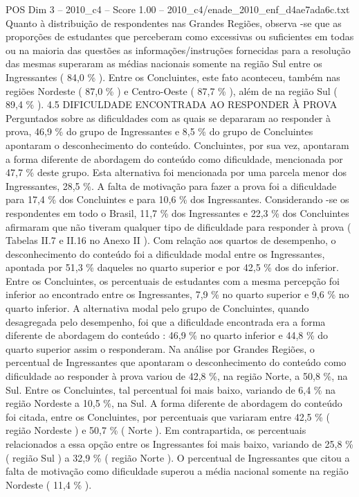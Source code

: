 \begin{textsample}{POS Dim 3 – 2010\_c4 – Score 1.00 – 2010\_c4/enade\_2010\_enf\_d4ae7ada6c.txt}
Quanto à distribuição de respondentes nas Grandes Regiões, observa -se que as proporções de estudantes que perceberam como excessivas ou suficientes em todas ou na maioria das questões as informações/instruções fornecidas para a resolução das mesmas superaram as médias nacionais somente na região Sul entre os Ingressantes ( 84,0 \% ).
Entre os Concluintes, este fato aconteceu, também nas regiões Nordeste ( 87,0 \% ) e Centro-Oeste ( 87,7 \% ), além de na região Sul ( 89,4 \% ). 4.5 DIFICULDADE ENCONTRADA AO RESPONDER À PROVA Perguntados sobre as dificuldades com as quais se depararam ao responder à prova, 46,9 \% do grupo de Ingressantes e 8,5 \% do grupo de Concluintes apontaram o desconhecimento do conteúdo.
Concluintes, por sua vez, apontaram a forma diferente de abordagem do conteúdo como dificuldade, mencionada por 47,7 \% deste grupo.
Esta alternativa foi mencionada por uma parcela menor dos Ingressantes, 28,5 \%.
A falta de motivação para fazer a prova foi a dificuldade para 17,4 \% dos Concluintes e para 10,6 \% dos Ingressantes.
Considerando -se os respondentes em todo o Brasil, 11,7 \% dos Ingressantes e 22,3 \% dos Concluintes afirmaram que não tiveram qualquer tipo de dificuldade para responder à prova ( Tabelas II.7 e II.16 no Anexo II ).
Com relação aos quartos de desempenho, o desconhecimento do conteúdo foi a dificuldade modal entre os Ingressantes, apontada por 51,3 \% daqueles no quarto superior e por 42,5 \% dos do inferior.
Entre os Concluintes, os percentuais de estudantes com a mesma percepção foi inferior ao encontrado entre os Ingressantes, 7,9 \% no quarto superior e 9,6 \% no quarto inferior.
A alternativa modal pelo grupo de Concluintes, quando desagregada pelo desempenho, foi que a dificuldade encontrada era a forma diferente de abordagem do conteúdo : 46,9 \% no quarto inferior e 44,8 \% do quarto superior assim o responderam.
Na análise por Grandes Regiões, o percentual de Ingressantes que apontaram o desconhecimento do conteúdo como dificuldade ao responder à prova variou de 42,8 \%, na região Norte, a 50,8 \%, na Sul.
Entre os Concluintes, tal percentual foi mais baixo, variando de 6,4 \% na região Nordeste a 10,5 \%, na Sul.
A forma diferente de abordagem do conteúdo foi citada, entre os Concluintes, por percentuais que variaram entre 42,5 \% ( região Nordeste ) e 50,7 \% ( Norte ).
Em contrapartida, os percentuais relacionados a essa opção entre os Ingressantes foi mais baixo, variando de 25,8 \% ( região Sul ) a 32,9 \% ( região Norte ).
O percentual de Ingressantes que citou a falta de motivação como dificuldade superou a média nacional somente na região Nordeste ( 11,4 \% ).

\end{textsample}
